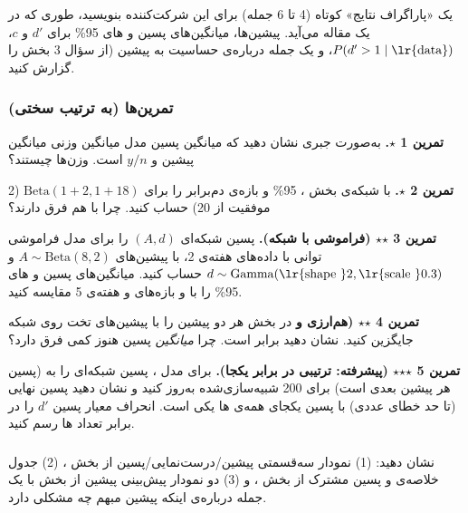 یک «پاراگراف نتایج» کوتاه (4 تا 6 جمله) برای این شرکت‌کننده بنویسید، طوری
که در یک مقاله می‌آید. پیشین‌ها، میانگین‌های پسین و های 95\% برای
\(d'\) و \(c\)، \(P(d' > 1 \mid \text{\lr{data}})\)، و یک جمله درباره‌ی حساسیت
به پیشین (از سؤال 3 بخش  را گزارش کنید.

\subsubsection{تمرین‌ها (به ترتیب سختی)}

\textbf{تمرین 1 \ensuremath{\star}.} به‌صورت جبری نشان دهید که میانگین پسین مدل
 میانگین وزنی میانگین پیشین و \(y/n\) است. وزن‌ها
چیستند؟

\textbf{تمرین 2 \ensuremath{\star}.} با شبکه‌ی بخش ،  95\% و بازه‌ی دم‌برابر
را برای \(\mathrm{Beta}(1 + 2, 1 + 18)\) (2 موفقیت از 20) حساب کنید. چرا
با هم فرق دارند؟

\textbf{تمرین 3 \ensuremath{\star}\ensuremath{\star} (فراموشی با شبکه).} پسین شبکه‌ای \((A, d)\) را برای
مدل فراموشی توانی با داده‌های هفته‌ی 2، با پیشین‌های
\(A \sim \mathrm{Beta}(8, 2)\) و
\(d \sim \mathrm{Gamma}(\text{\lr{shape }} 2, \text{\lr{scale }} 0.3)\) حساب کنید.
میانگین‌های پسین و های 95\% را با  و بازه‌های 
و  هفته‌ی 5 مقایسه کنید.

\textbf{تمرین 4 \ensuremath{\star}\ensuremath{\star} (هم‌ارزی  و } در بخش  هر دو
پیشین را با پیشین‌های تخت روی شبکه جایگزین کنید. نشان دهید  برابر
 است. چرا \emph{میانگین} پسین هنوز کمی فرق دارد؟

\textbf{تمرین 5 \ensuremath{\star}\ensuremath{\star}\ensuremath{\star} (پیشرفته: ترتیبی در برابر یکجا).} برای مدل ،
پسین شبکه‌ای را  به  (پسین هر  پیشین
 بعدی است) برای 200  شبیه‌سازی‌شده به‌روز کنید و نشان
دهید پسین نهایی (تا حد خطای عددی) با پسین یکجای همه‌ی ها یکی
است. انحراف معیار پسین \(d'\) را در برابر تعداد ها رسم کنید.

\subsubsection{\texorpdfstring{}{lab check-off}}

نشان دهید: (1) نمودار سه‌قسمتی پیشین/درست‌نمایی/پسین از بخش ، (2)
جدول خلاصه‌ی  و پسین مشترک از بخش ، و (3) دو نمودار پیش‌بینی
پیشین از بخش  با یک جمله درباره‌ی اینکه پیشین مبهم چه مشکلی دارد.

